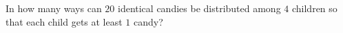 In how many ways can $20$ identical candies be distributed among $4$ children so that each child gets at least $1$ candy?
